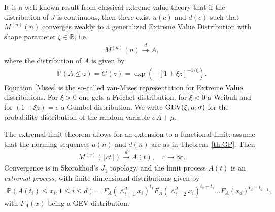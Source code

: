 \documentclass[12pt]{article}
\newcommand{\PP}{\mathbb{P}}
\newcommand{\1}{\mathbf 1}
\begin{document}
It is a well-known result from classical extreme value theory that 
if the distribution of $J$ is continuous, then there exist $a(c)$ and $d(c)$
such that 
$M^{(n)}(n)$ converges weakly to a generalized Extreme Value Distribution with shape parameter $\xi \in \mathbb R$, i.e.
\begin{align}
M^{(n)}(n) \stackrel{d}{\to} A,
\end{align}
where the distribution of $A$ is given by
\begin{align}
\PP(A \le z) = G(z) = \exp\left(-[1+\xi z]^{-1/\xi}\right). \label{Mises}
\end{align}
Equation \eqref{Mises} is the so-called van-Mises representation for Extreme Value distributions. For $\xi>0$ one gets a Fr\'echet distribution, for $\xi<0$ a Weibull and for $(1+\xi z)=e$ a Gumbel distribution. We write ${\rm GEV}(\xi, \mu, \sigma)$ for the probability 
distribution of the random variable $\sigma A + \mu$. 

The extremal limit theorem allows for an extension to a functional
limit: assume that the norming sequences $a(n)$ and $d(n)$ are as 
in Theorem~\ref{th:GP}. Then 
\begin{align*}
M^{(c)}(\lfloor ct \rfloor)
\stackrel{d}{\to} A(t),
\quad c \to \infty.
\end{align*}
Convergence is in Skorokhod's $J_1$ topology, and the limit
process $A(t)$ is an \emph{extremal process}, with
finite-dimensional distributions given by
\begin{align*}
\PP(A(t_i)\leq x_i,1\leq i \leq d) 
= F_A(\wedge_{i=1}^d x_i)^{t_1} 
F_A(\wedge_{i=2}^d x_i)^{t_2-t_1}
\ldots F_A(x_d)^{t_d-t_{d-1}},
\end{align*}
with $F_A(x)$ being a GEV distribution.
\end{document}
